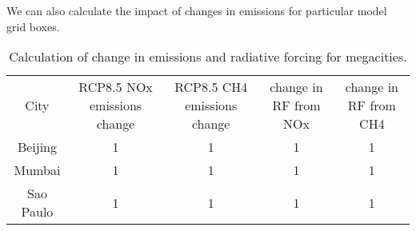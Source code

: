 We can also calculate the impact of changes in emissions for particular model grid boxes.

\begin{table} 
  \label{tab:megacity}
  \begin{tabular}{ c c c c c }
        City & RCP8.5 NOx emissions change & RCP8.5 CH4 emissions change & change in RF from NOx & change in RF from CH4 \\ 
        Beijing & 1 & 1 & 1 & 1 \\ 
        Mumbai & 1 & 1 & 1 & 1 \\ 
        Sao Paulo & 1 & 1 & 1 & 1 \\ 
    \end{tabular} 
    \caption{Calculation of change in emissions and radiative forcing for megacities.} 
\end{table}

